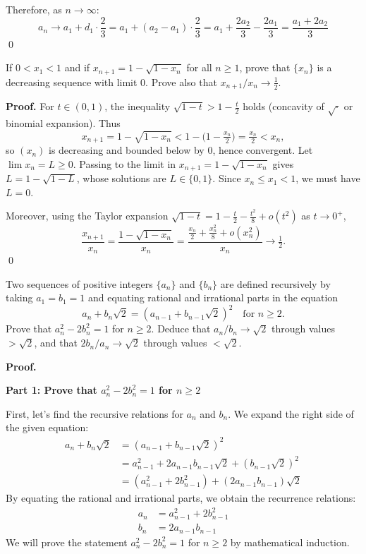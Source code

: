 Therefore, as $n \to \infty$:
\[
a_n \to a_1 + d_1 \cdot \frac{2}{3} = a_1 + (a_2 - a_1) \cdot \frac{2}{3} = a_1 + \frac{2a_2}{3} - \frac{2a_1}{3} = \frac{a_1 + 2a_2}{3}
\]\qed



\begin{problembox}
If $0 < x_1 < 1$ and if $x_{n+1} = 1 - \sqrt{1 - x_n}$ for all $n \geq 1$, prove that $\{x_n\}$ is a decreasing sequence with limit 0. Prove also that $x_{n+1}/x_n \to \frac{1}{2}$.
\end{problembox}

\noindent\textbf{Proof.}
For $t\in(0,1)$, the inequality $\sqrt{1-t}>1-\tfrac{t}{2}$ holds (concavity of $\sqrt{\cdot}$ or binomial expansion). Thus
\[
x_{n+1}=1-\sqrt{1-x_n}<1-\Big(1-\tfrac{x_n}{2}\Big)=\tfrac{x_n}{2}<x_n,
\]
so $(x_n)$ is decreasing and bounded below by $0$, hence convergent. Let $\lim x_n=L\ge 0$. Passing to the limit in $x_{n+1}=1-\sqrt{1-x_n}$ gives $L=1-\sqrt{1-L}$, whose solutions are $L\in\{0,1\}$. Since $x_n\le x_1<1$, we must have $L=0$.

Moreover, using the Taylor expansion $\sqrt{1-t}=1-\tfrac{t}{2}-\tfrac{t^2}{8}+o(t^2)$ as $t\to 0^+$,
\[
\frac{x_{n+1}}{x_n}=\frac{1-\sqrt{1-x_n}}{x_n}=\frac{\tfrac{x_n}{2}+\tfrac{x_n^2}{8}+o(x_n^2)}{x_n}\to \tfrac12.
\]\qed
\medskip



\begin{problembox}
Two sequences of positive integers $\{a_n\}$ and $\{b_n\}$ are defined recursively by taking $a_1 = b_1 = 1$ and equating rational and irrational parts in the equation
\[a_n + b_n \sqrt{2} = (a_{n-1} + b_{n-1} \sqrt{2})^2 \quad \text{for } n \geq 2.\]
Prove that $a_n^2 - 2b_n^2 = 1$ for $n \geq 2$. Deduce that $a_n/b_n \to \sqrt{2}$ through values $> \sqrt{2}$, and that $2b_n/a_n \to \sqrt{2}$ through values $< \sqrt{2}$.
\end{problembox}

\noindent\textbf{Proof.}

\textbf{Part 1: Prove that $a_n^2 - 2b_n^2 = 1$ for $n \geq 2$}

First, let's find the recursive relations for $a_n$ and $b_n$. We expand the right side of the given equation:
\begin{align*}
a_n + b_n \sqrt{2} &= (a_{n-1} + b_{n-1} \sqrt{2})^2 \\
&= a_{n-1}^2 + 2a_{n-1}b_{n-1}\sqrt{2} + (b_{n-1}\sqrt{2})^2 \\
&= (a_{n-1}^2 + 2b_{n-1}^2) + (2a_{n-1}b_{n-1})\sqrt{2}
\end{align*}
By equating the rational and irrational parts, we obtain the recurrence relations:
\begin{align}
a_n &= a_{n-1}^2 + 2b_{n-1}^2 \label{eq:an} \\
b_n &= 2a_{n-1}b_{n-1} \label{eq:bn}
\end{align}
We will prove the statement $a_n^2 - 2b_n^2 = 1$ for $n \geq 2$ by mathematical induction.

